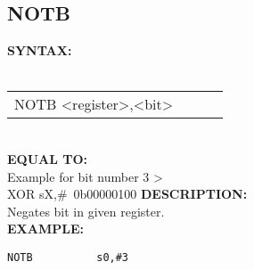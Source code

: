 {                \subsection{NOTB}
                \textbf{SYNTAX:}\\
                \\ {
                    \texttt{}
                    \begin{tabular}[h!]{llll}
                            { \color{highlight_instruction} NOTB    } { \color{highlight_symbol} <register>,<bit> }
                            { \color{highlight_comment}  }\\
                    \end{tabular}
                    }\\
                    \textbf{EQUAL TO:}\\
                    Example for bit number 3 >\\
                    { \color{highlight_instruction} XOR    } { \color{highlight_symbol}      sX,\#~0b00000100 }
                \textbf{DESCRIPTION:}\\
                Negates bit in given register.\\
                \textbf{EXAMPLE:}\\
                        \begin{code}[h!]
                            {\color{highlight_symbol}\verb'NOTB          s0,#3' }\\
                        \end{code}

}
